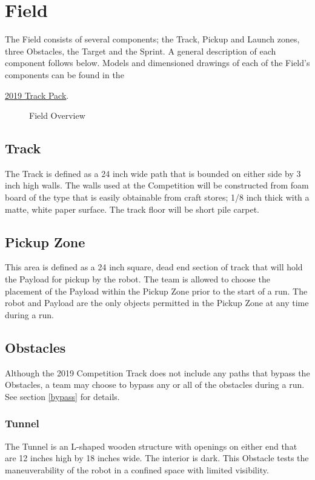 \section{Field}
The Field consists of several components; the Track, Pickup and Launch zones, three Obstacles, the Target and the Sprint. A general description of each component follows below. Models and dimensioned drawings of each of the Field’s components can be found in the {\col\href{https://mercury.okstate.edu/content/mercury-challenge}{2019 Track Pack}.

\begin{figure}[H]
	\centering
	\caption{Field Overview}
	\label{fig:field} 
\end{figure}

\subsection{Track}
The Track is defined as a 24 inch wide path that is bounded on either side by 3 inch high walls. The walls used at the Competition will be constructed from foam board of the type that is easily obtainable from craft stores; 1/8 inch thick with a matte, white paper surface. The track floor will be short pile carpet.

\subsection{Pickup Zone}
This area is defined as a 24 inch square, dead end section of track that will hold the Payload for pickup by the robot. The team is allowed to choose the placement of the Payload within the Pickup Zone prior to the start of a run. The robot and Payload are the only objects permitted in the Pickup Zone at any time during a run. 

\subsection{Obstacles}
Although the 2019 Competition Track does not include any paths that bypass the Obstacles, a team may choose to bypass any or all of the obstacles during a run. See section \ref{bypass} for details.
\subsubsection{Tunnel}
The Tunnel is an L-shaped wooden structure with openings on either end that are 12 inches high by 18 inches wide. The interior is dark. This Obstacle tests the maneuverability of the robot in a confined space with limited visibility.

}
